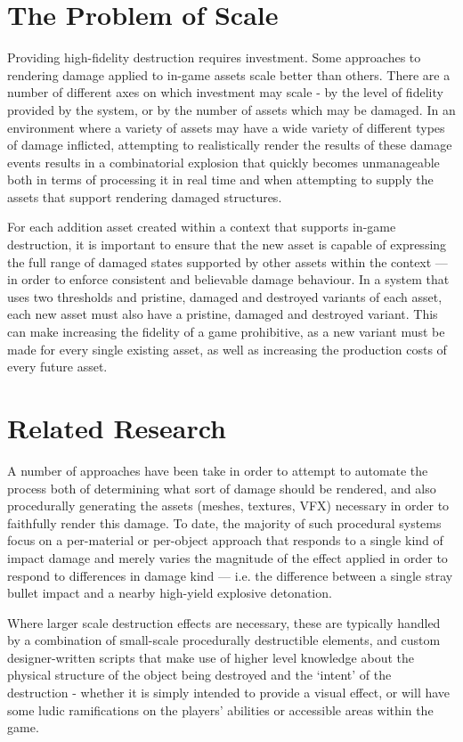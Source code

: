 \documentclass[11pt]{report}
\begin{document}
	\section{The Problem of Scale}
		Providing high-fidelity destruction requires investment. Some approaches to rendering damage applied to in-game assets scale better than others. There are a number of different axes on which investment may scale - by the level of fidelity provided by the system, or by the number of assets which may be damaged. In an environment where a variety of assets may have a wide variety of different types of damage inflicted, attempting to realistically render the results of these damage events results in a combinatorial explosion that quickly becomes unmanageable both in terms of processing it in real time and when attempting to supply the assets that support rendering damaged structures.

		For each addition asset created within a context that supports in-game destruction, it is important to ensure that the new asset is capable of expressing the full range of damaged states supported by other assets within the context --- in order to enforce consistent and believable damage behaviour. In a system that uses two thresholds and pristine, damaged and destroyed variants of each asset, each new asset must also have a pristine, damaged and destroyed variant. This can make increasing the fidelity of a game prohibitive, as a new variant must be made for every single existing asset, as well as increasing the production costs of every future asset.

	\section{Related Research}
		A number of approaches have been take in order to attempt to automate the process both of determining what sort of damage should be rendered, and also procedurally generating the assets (meshes, textures, VFX) necessary in order to faithfully render this damage. To date, the majority of such procedural systems focus on a per-material or per-object approach that responds to a single kind of impact damage and merely varies the magnitude of the effect applied in order to respond to differences in damage kind --- i.e. the difference between a single stray bullet impact and a nearby high-yield explosive detonation.

		Where larger scale destruction effects are necessary, these are typically handled by a combination of small-scale procedurally destructible elements, and custom designer-written scripts that make use of higher level knowledge about the physical structure of the object being destroyed and the `intent' of the destruction - whether it is simply intended to provide a visual effect, or will have some ludic ramifications on the players' abilities or accessible areas within the game.
\end{document}
